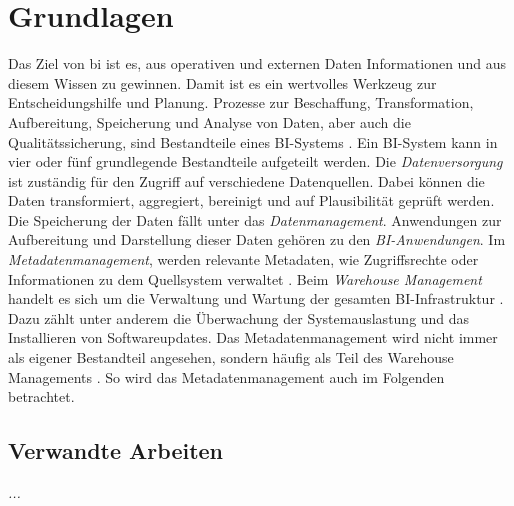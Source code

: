 \chapter{Grundlagen} \label{ch:background}
Das Ziel von \ac{bi} ist es, aus operativen und externen Daten Informationen und aus diesem Wissen zu gewinnen. Damit ist es ein wertvolles Werkzeug zur Entscheidungshilfe und Planung. Prozesse zur Beschaffung, Transformation, Aufbereitung, Speicherung und Analyse von Daten, aber auch die Qualitätssicherung, sind Bestandteile eines BI-Systems \cite{muller_business_2013}. Ein BI-System kann in vier oder fünf grundlegende Bestandteile aufgeteilt werden. Die \textit{Datenversorgung} ist zuständig für den Zugriff auf verschiedene Datenquellen. Dabei können die Daten transformiert, aggregiert, bereinigt und auf Plausibilität geprüft werden. Die Speicherung der Daten fällt unter das \textit{Datenmanagement}. Anwendungen zur Aufbereitung und Darstellung dieser Daten gehören zu den \textit{BI-Anwendungen}. Im \textit{Metadatenmanagement}, werden relevante Metadaten, wie Zugriffsrechte oder Informationen zu dem Quellsystem verwaltet \cite{kemper_bi-glossar_2008}. Beim \textit{Warehouse Management} handelt es sich um die Verwaltung und Wartung der gesamten BI-Infrastruktur \cite{grunwald_business_2009}. Dazu zählt unter anderem die Überwachung der Systemauslastung und das Installieren von Softwareupdates. Das {Metadatenmanagement} wird nicht immer als eigener Bestandteil angesehen, sondern häufig als Teil des {Warehouse Managements} \cite{humm_architektur_2005}. So wird das {Metadatenmanagement} auch im Folgenden betrachtet.

\section{Verwandte Arbeiten} \label{ch:verwandteArbeiten}
\textit{...}

